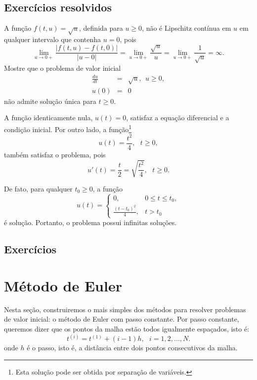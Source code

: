 \subsection*{Exercícios resolvidos}

\begin{exeresol}
A função $f(t,u)=\sqrt{u}$, definida para $u\geq 0$, não é Lipschitz contínua em $u$ em qualquer intervalo que contenha $u=0$, pois
\begin{equation}
\lim_{u\to 0+}\frac{|f(t,u)-f(t,0)|}{|u-0|}
=\lim_{u\to 0+}\frac{\sqrt{u}}{u}
=\lim_{u\to 0+}\frac{1}{\sqrt{u}}
=\infty.
\end{equation}
Mostre que o problema de valor inicial
\begin{eqnarray}
\frac{du}{dt} &=&\sqrt{u},~~u\geq 0,\\
u(0) &=& 0
\end{eqnarray}
não admite solução única para $t\geq 0$.
\end{exeresol}
\begin{resol}
A função identicamente nula, $u(t)=0$, satisfaz a equação diferencial e a condição inicial. Por outro lado, a função\footnote{Esta solução pode ser obtida por separação de variáveis.}
\begin{equation}
u(t)=\frac{t^2}{4},~~~t\geq 0,
\end{equation}
também satisfaz o problema, pois
\begin{equation}
u'(t)=\frac{t}{2}=\sqrt{\frac{t^2}{4}},~~~t\geq 0.
\end{equation}

De fato, para qualquer $t_0\geq 0$, a função
\begin{equation}
u(t)=\left\{
\begin{array}{ll}
 0,&0\leq t\leq t_0,\\
 \frac{(t-t_0)^2}{4},&t>t_0
\end{array}
\right.
\end{equation}
é solução. Portanto, o problema possui infinitas soluções.
\end{resol}

\subsection*{Exercícios}

\construirExer

\section{Método de Euler}\label{sec:euler}
Nesta seção, construiremos o mais simples dos métodos para resolver problemas de valor inicial: o método de Euler com passo constante. Por passo constante, queremos dizer que os pontos da malha estão todos igualmente espaçados, isto é:
\begin{equation} t^{(i)}=t^{(1)}+(i-1)h,~~~i=1,2,\ldots,N. \end{equation}
onde $h$ é o passo, isto é, a distância entre dois pontos consecutivos da malha.

